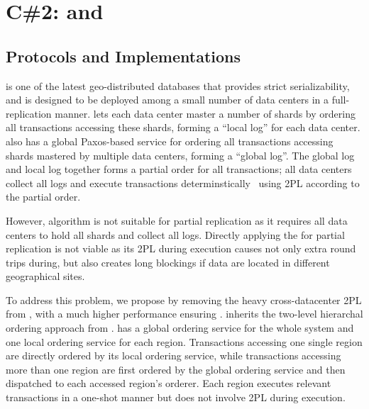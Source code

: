 \section{C\#2: \slog and \slogxx}


\subsection{Protocols and Implementations}

\slog is one of the latest geo-distributed databases that provides 
strict serializability, and \slog is designed to be deployed 
among a small number of data centers in a full-replication 
manner. \slog lets each data center master a number of shards by 
ordering all transactions accessing these shards, forming a 
``local log'' for each data center. \slog also 
has a global Paxos-based service for ordering all 
transactions accessing shards mastered by multiple data centers,
forming a ``global log''. The global log and local log 
together forms a partial order for all transactions; all data centers 
collect all logs and execute transactions determinstically~\cite{calvin:sigmod12, slog} 
using 2PL according to the partial order. 

However, \slog algorithm is not suitable for partial replication 
as it requires all data centers to hold all shards and collect 
all logs. Directly applying the \slog for partial replication is 
not viable as its 2PL during execution causes not only
extra round trips during, but also creates long blockings if 
data are located in different geographical sites. 

To address this problem, we propose \slogxx by removing 
the heavy cross-datacenter 2PL from \slog, with a much higher performance 
ensuring \xxcons. 
\slogxx inherits the two-level hierarchal ordering approach from
\slog. \slogxx has a global ordering service for the whole system 
and one local ordering service for each region. Transactions accessing 
one single region are directly ordered by its local ordering service, while 
transactions accessing more than one region are first ordered 
by the global ordering service and then dispatched to each accessed region's 
orderer. Each region executes relevant transactions in a one-shot manner 
but does not involve 2PL during execution. 

